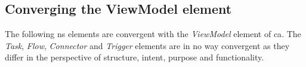 \subsection{Converging the ViewModel element} \label{converging_viewmodel_element}

The following \gls{ns} elements are convergent with the \emph{ViewModel} element of
\gls{ca}. The \emph{Task}, \emph{Flow}, \emph{Connector} and \emph{Trigger} elements are
in no way convergent as they differ in the perspective of structure, intent, purpose and
functionality. 


